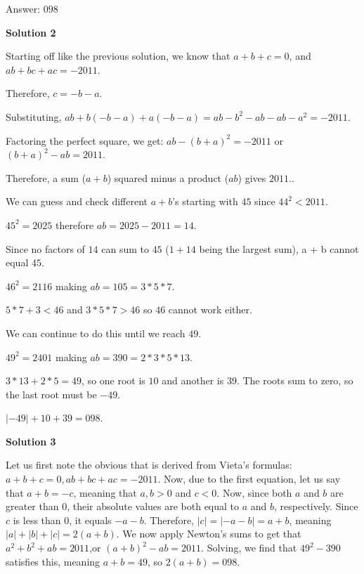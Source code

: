 \begin{enumerate}
 Answer: $\boxed{098}$




\textbf{Solution 2}

Starting off like the previous solution, we know that $a + b + c = 0$, and $ab + bc + ac = -2011$.

 Therefore, $c = -b-a$.

 Substituting, $ab + b(-b-a) + a(-b-a) = ab-b^2-ab-ab-a^2 = -2011$.

 Factoring the perfect square, we get: $ab-(b+a)^2=-2011$ or $(b+a)^2-ab=2011$.

 Therefore, a sum ($a+b$) squared minus a product ($ab$) gives $2011$..

 


 We can guess and check different $a+b$’s starting with $45$ since $44^2 < 2011$.

 $45^2 = 2025$ therefore $ab = 2025-2011 = 14$. 

 Since no factors of $14$ can sum to $45$ ($1+14$ being the largest sum), a + b cannot equal $45$.

 $46^2 = 2116$ making $ab = 105 = 3 * 5 * 7$.

 $5 * 7 + 3 < 46$ and $3 * 5 * 7 > 46$ so $46$ cannot work either.

 


 We can continue to do this until we reach $49$.

 $49^2 =  2401$ making $ab = 390 = 2 * 3 * 5* 13$.

 $3 * 13 + 2* 5 = 49$, so one root is $10$ and another is $39$. The roots sum to zero, so the last root must be $-49$.

 


 $|-49|+10+39 = \boxed{098}$.

 



\textbf{Solution 3}

Let us first note the obvious that is derived from Vieta's formulas: $a+b+c=0, ab+bc+ac=-2011$. Now, due to the first equation, let us say that $a+b=-c$, meaning that $a,b>0$ and $c<0$. Now, since both $a$ and $b$ are greater than 0, their absolute values are both equal to $a$ and $b$, respectively. Since $c$ is less than 0, it equals $-a-b$. Therefore, $|c|=|-a-b|=a+b$, meaning $|a|+|b|+|c|=2(a+b)$. We now apply Newton's sums to get that $a^2+b^2+ab=2011$,or $(a+b)^2-ab=2011$. Solving, we find that $49^2-390$ satisfies this, meaning $a+b=49$, so $2(a+b)=\boxed{098}$.

 




\end{enumerate}
